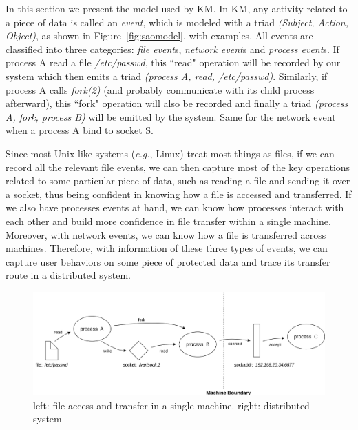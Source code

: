 \documentclass[letterpaper,twocolumn,10pt]{article}
\begin{document}
In this section we present the model used by KM. In KM, any activity related
to a piece of data is called an \textit{event}, which is modeled with a triad
\textit{(Subject, Action, Object)}, as shown in Figure~\ref{fig:saomodel},
with examples. All events are classified into three categories: \textit{file
event}s, \textit{network event}s and \textit{process event}s. If process A
read a file \textit{/etc/passwd}, this ``read" operation will be recorded by
our system which then emits a triad \textit{(process A, read, /etc/passwd)}.
Similarly, if process A calls \textit{fork(2)} (and probably communicate with
its child process afterward), this ``fork" operation will also be recorded
and finally a triad \textit{(process A, fork, process B)} will be emitted by
the system. Same for the network event when a process A bind to socket S. 

Since most Unix-like systems (\textit{e.g.}, Linux) treat most things as
files, if we can record all the relevant file events, we can then capture
most of the key operations related to some particular piece of data, such as
reading a file and sending it over a socket, thus being confident in knowing
how a file is accessed and transferred. If we also have 
processes events at hand, we can know how processes interact with each other
and build more confidence in file transfer within a single machine. Moreover,
with network events, we can know how a file is transferred across machines.
Therefore, with information of these three types of events, we can capture
user behaviors on some piece of protected data and trace its transfer route
in a distributed system.\\

\begin{figure}
    \centering
    \includegraphics[scale=0.06]{filetransfermodel}
    \caption{left: file access and transfer in a single machine. right: distributed system }
    \label{fig:filetransfermodel}
\end{figure}
\end{document}
